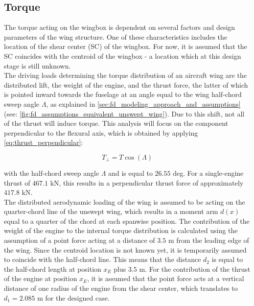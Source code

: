 \subsection*{Torque}
The torque acting on the wingbox is dependent on several factors and design parameters of the wing structure. One of these characteristics includes the location of the shear center (SC) of the wingbox. For now, it is assumed that the SC coincides with the centroid of the wingbox \cite{Timmer2024AE2111-IReader} - a location which at this design stage is still unknown.\\

\noindent The driving loads determining the torque distribution of an aircraft wing are the distributed lift, the weight of the engine, and the thrust force, the latter of which is pointed inward towards the fuselage at an angle equal to the wing half-chord sweep angle $\Lambda$, as explained in \autoref{sec:fd_modeling_approach_and_assumptions} (see: \autoref{fig:fd_assumptions_equivalent_unswept_wing}). Due to this shift, not all of the thrust will induce torque. This analysis will focus on the component perpendicular to the flexural axis, which is obtained by applying \autoref{eq:thrust_perpendicular}:

\begin{equation}
    \label{eq:thrust_perpendicular}
    T_{\perp} = T\cos(\Lambda)
\end{equation}

\noindent  with the half-chord sweep angle $\Lambda$ and is equal to $26.55$ deg. For a single-engine thrust of $467.1$ kN, this results in a perpendicular thrust force of approximately $417.8$ kN.\\

\noindent The distributed aerodynamic loading of the wing is assumed to be acting on the quarter-chord line of the unswept wing, which results in a moment arm $d(x)$ equal to a quarter of the chord at each spanwise position. The contribution of the weight of the engine to the internal torque distribution is calculated using the assumption of a point force acting at a distance of $3.5$ m from the leading edge of the wing. Since the centroid location is not known yet, it is temporarily assumed to coincide with the half-chord line. This means that the distance $d_2$ is equal to the half-chord length at position $x_E$ plus $3.5$ m. For the contribution of the thrust of the engine at position $x_E$, it is assumed that the point force acts at a vertical distance of one radius of the engine from the shear center, which translates to $d_1 = 2.085$ m for the designed case. \\

